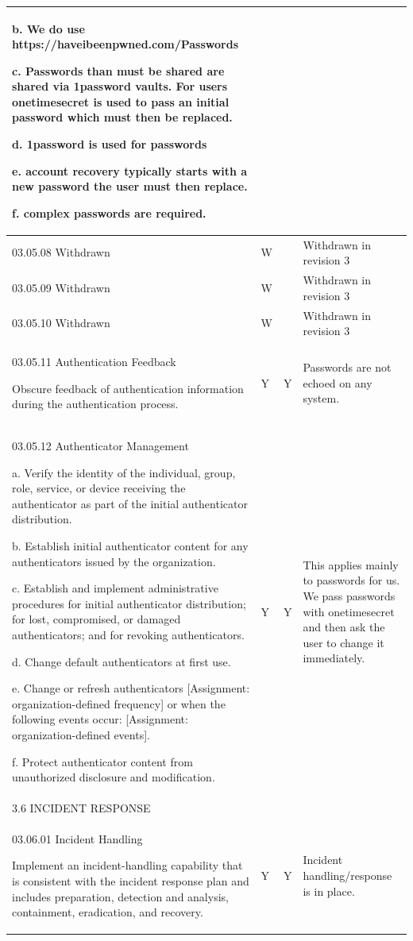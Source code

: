 \begin{longtable} {|p{}|p{}|p{}|p{} |}
{b. We do use https://haveibeenpwned.com/Passwords

c. Passwords than must be shared are shared via 1password vaults. For users onetimesecret is used to pass an initial password which must then be replaced.

d. 1password is used for passwords

e. account recovery typically starts with a new password the user must then replace.

f. complex passwords are required.} \\ \hline
{03.05.08 Withdrawn}&{W}&{}&{Withdrawn in revision 3} \\ \hline
{03.05.09 Withdrawn}&{W}&{}&{Withdrawn in revision 3} \\ \hline
{03.05.10 Withdrawn}&{W}&{}&{Withdrawn in revision 3} \\ \hline
{03.05.11 Authentication Feedback

Obscure feedback of authentication information during the authentication process.}&{Y}&{Y}&{Passwords are not echoed on any system.} \\ \hline
{03.05.12 Authenticator Management

a. Verify the identity of the individual, group, role, service, or device receiving the authenticator as part of the initial authenticator distribution.

b. Establish initial authenticator content for any authenticators issued by the organization.

c. Establish and implement administrative procedures for initial authenticator distribution; for lost, compromised, or damaged authenticators; and for revoking authenticators.

d. Change default authenticators at first use.

e. Change or refresh authenticators [Assignment: organization-defined frequency] or when the following events occur: [Assignment: organization-defined events].

f. Protect authenticator content from unauthorized disclosure and modification.}&{Y}&{Y}&{This applies mainly to passwords for us. We pass passwords with onetimesecret and then ask the user to change it immediately. } \\ \hline
{3.6 INCIDENT RESPONSE}&&& \\ \hline
{03.06.01 Incident Handling

Implement an incident-handling capability that is consistent with the incident
response plan and includes preparation, detection and analysis, containment,
eradication, and recovery. }&{Y}&{Y}&{Incident handling/response is in place.

}
\end{longtable}
